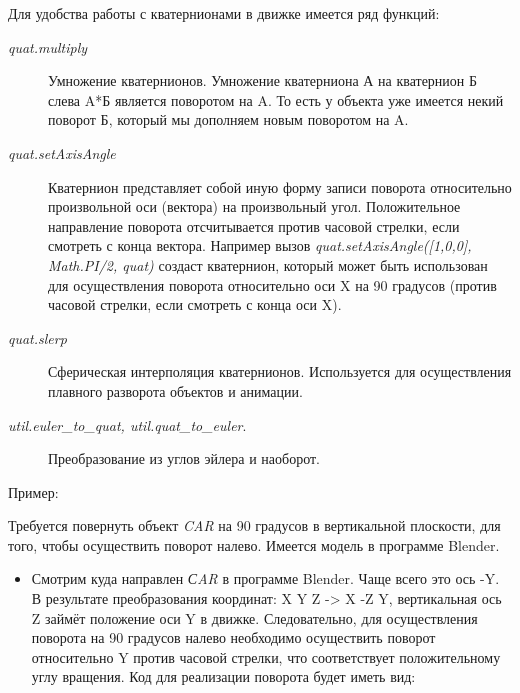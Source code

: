 \documentclass[a4paper,12pt,oneside]{sphinxmanual}
\begin{document}
Для удобства работы с кватернионами в движке имеется ряд функций:
\begin{description}
\item[{\emph{quat.multiply}}] \leavevmode
Умножение кватернионов. Умножение кватерниона А на кватернион Б слева A*Б является поворотом на A. То есть у объекта уже имеется некий поворот Б, который мы дополняем новым поворотом на A.

\item[{\emph{quat.setAxisAngle}}] \leavevmode
Кватернион представляет собой иную форму записи поворота относительно произвольной оси (вектора) на произвольный угол. Положительное направление поворота отсчитывается против часовой стрелки, если смотреть с конца вектора. Например вызов \emph{quat.setAxisAngle({[}1,0,0{]}, Math.PI/2, quat)} создаст кватернион, который может быть использован для осуществления поворота относительно оси X на 90 градусов (против часовой стрелки, если смотреть с конца оси X).

\item[{\emph{quat.slerp}}] \leavevmode
Сферическая интерполяция кватернионов. Используется для осуществления плавного разворота объектов и анимации.

\item[{\emph{util.euler\_to\_quat, util.quat\_to\_euler}.}] \leavevmode
Преобразование из углов эйлера и наоборот.

\end{description}

Пример:

Требуется повернуть объект \emph{CAR} на 90 градусов в вертикальной плоскости, для того, чтобы осуществить поворот налево. Имеется модель в программе Blender.
\begin{itemize}
\item {} 
Смотрим куда направлен \emph{СAR} в программе Blender. Чаще всего это ось -Y. В результате преобразования координат: X Y Z -\textgreater{} X -Z Y, вертикальная ось Z займёт положение оси Y в движке. Следовательно, для осуществления поворота на 90 градусов налево необходимо осуществить поворот относительно Y против часовой стрелки, что соответствует положительному углу вращения. Код для реализации поворота будет иметь вид:

\end{itemize}
\end{document}
